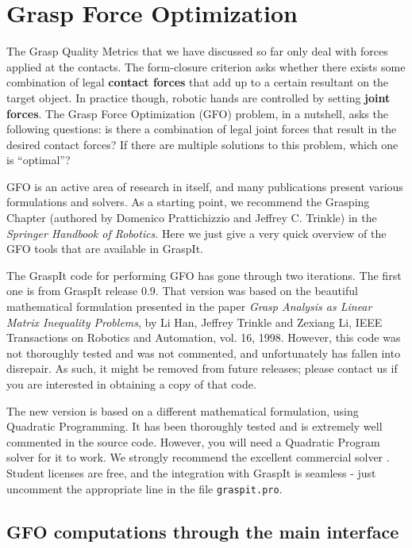 \section{Grasp Force Optimization}

The Grasp Quality Metrics that we have discussed so far only deal with
forces applied at the contacts. The form-closure criterion asks
whether there exists some combination of legal \textbf{contact forces}
that add up to a certain resultant on the target object. In practice
though, robotic hands are controlled by setting \textbf{joint
  forces}. The Grasp Force Optimization (GFO) problem, in a nutshell,
asks the following questions: is there a combination of legal joint
forces that result in the desired contact forces? If there are
multiple solutions to this problem, which one is ``optimal''?

GFO is an active area of research in itself, and many publications
present various formulations and solvers. As a starting point, we
recommend the Grasping Chapter (authored by Domenico Prattichizzio and
Jeffrey C. Trinkle) in the \textit{Springer Handbook of
  Robotics}. Here we just give a very quick overview of the GFO tools
that are available in GraspIt.

The GraspIt code for performing GFO has gone through two
iterations. The first one is from GraspIt release 0.9. That version was
based on the beautiful mathematical formulation presented in the paper
\textit{Grasp Analysis as Linear Matrix Inequality Problems}, by Li
Han, Jeffrey Trinkle and Zexiang Li, IEEE Transactions on Robotics and
Automation, vol. 16, 1998. However, this code was not thoroughly
tested and was not commented, and unfortunately has fallen into
disrepair. As such, it might be removed from future releases; please
contact us if you are interested in obtaining a copy of that code.

The new version is based on a different mathematical formulation,
using Quadratic Programming. It has been thoroughly tested and is
extremely well commented in the source code. However, you will need a
Quadratic Program solver for it to work. We strongly recommend the
excellent commercial solver
. Student licenses are free, and
the integration with GraspIt is seamless - just uncomment the
appropriate line in the file \texttt{graspit.pro}.

\subsection{GFO computations through the main interface}

